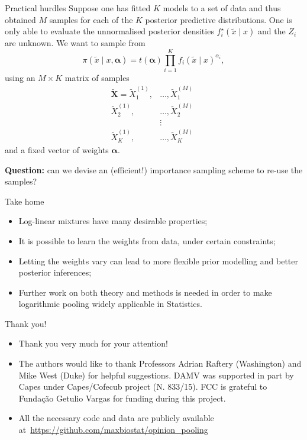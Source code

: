 \begin{frame}{Practical hurdles}
Suppose one has fitted $K$ models to a set of data and thus obtained $M$ samples for each of the $K$ posterior predictive distributions.
One is only able to evaluate the unnormalised posterior densities $f_i^\star(\tilde{x} \mid x)$ and the $Z_i$ are unknown.
We want to sample from
\begin{equation*}
\label{eq:pooled_predictive}
 \pi(\tilde{x} \mid x, \boldsymbol{\alpha}) = t(\boldsymbol{\alpha}) \prod_{i=1}^K f_i(\tilde{x} \mid x)^{\alpha_i},
\end{equation*}
using an $M \times K$ matrix of samples
\begin{align*}
\boldsymbol{\tilde{X}} = \tilde{X}_1^{(1)},&\ldots, \tilde{X}_1^{(M)}\\
\tilde{X}_2^{(1)},&\ldots, \tilde{X}_2^{(M)}\\ 
&\vdots\\
\tilde{X}_K^{(1)},& \ldots, \tilde{X}_K^{(M)}\,\
\end{align*}
and a fixed vector of weights $\boldsymbol{\alpha}$.

{\large \textbf{Question:}} can we devise an (efficient!) importance sampling scheme to re-use the samples?
\end{frame}
\begin{frame}{Take home}
\begin{itemize}[label={$\boldsymbol\tau_h:$}]
 \item Log-linear mixtures have many desirable properties;\pause
 \item It is possible to learn the weights from data, under certain constraints;\pause
 \item Letting the weights vary can lead to more flexible prior modelling and better posterior inferences;\pause
 \item Further work on both theory and methods is needed in order to make logarithmic pooling widely applicable in Statistics.
\end{itemize}
\end{frame}
\begin{frame}{Thank you!}
 \begin{itemize}
  \item Thank you very much for your attention!
  \item The authors would like to thank Professors Adrian Raftery (Washington) and Mike West (Duke) for helpful suggestions.
DAMV was supported in part by Capes under Capes/Cofecub project (N. 833/15).
FCC is grateful to Funda\c{c}\~ao Getulio Vargas for funding during this project.
  \item All the necessary code and data are publicly available at~\url{https://github.com/maxbiostat/opinion_pooling}
 \end{itemize}
\end{frame}
